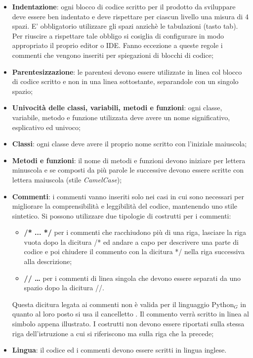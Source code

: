 \begin{itemize}
	\item \textbf{Indentazione}: ogni blocco di codice scritto per il prodotto da sviluppare deve essere ben indentato e deve rispettare per ciascun livello una misura di 4 spazi. E’ obbligatorio utilizzare gli spazi anzichè le tabulazioni (tasto tab). Per riuscire a rispettare tale obbligo si cosiglia di configurare in modo appropriato il proprio editor o IDE. Fanno eccezione a queste regole i commenti che vengono inseriti per spiegazioni di blocchi di codice;
	\item \textbf{Parentesizzazione}:  le parentesi devono essere utilizzate in linea col blocco di codice scritto e non in una linea sottostante, separandole con un singolo spazio;
	\item \textbf{Univocità delle classi, variabili, metodi e funzioni}: ogni classe, variabile, metodo e funzione utilizzata deve avere un nome significativo, esplicativo ed univoco;
	\item \textbf{Classi}: ogni classe deve avere il proprio nome scritto con l'iniziale maiuscola;
	\item \textbf{Metodi e funzioni}: il nome di metodi e funzioni devono iniziare per lettera minuscola e se composti da più parole le successive devono essere scritte con lettera maiuscola (stile \textit{CamelCase});
	\item \textbf{Commenti}: i commenti vanno inseriti solo nei casi in cui sono necessari per migliorare la comprensibilità e leggibilità del codice, mantenendo uno stile sintetico. Si possono utilizzare due tipologie di costrutti per i commenti:
	\begin{itemize}
		\item \textbf{/* ... */} per i commenti che racchiudono più di una riga, lasciare la riga vuota dopo la dicitura /* ed andare a capo per descrivere una parte di codice e poi chiudere il commento con la dicitura */ nella riga successiva alla descrizione;
		\item \textbf{// … } per i commenti di linea singola che devono essere separati da uno spazio dopo la dicitura //.
	\end{itemize}
	Questa dicitura legata ai commenti non è valida per il linguaggio Python$_G$ in quanto al loro posto si usa il cancelletto {}.
	Il commento verrà scritto in linea al simbolo appena illustrato.
	I costrutti non devono essere riportati sulla stessa riga dell’istruzione a cui si riferiscono ma sulla riga che la precede;
	\item \textbf{Lingua}: il codice ed i commenti devono essere scritti in lingua inglese.
\end{itemize}

